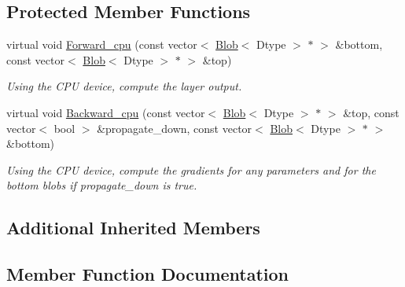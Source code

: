 \subsection*{Protected Member Functions}
\begin{DoxyCompactItemize}
\item 
virtual void \hyperlink{classcaffe_1_1ParameterLayer_a487f3dc2b570a6269b6fd17e8eb5944f}{Forward\+\_\+cpu} (const vector$<$ \hyperlink{classcaffe_1_1Blob}{Blob}$<$ Dtype $>$ $\ast$ $>$ \&bottom, const vector$<$ \hyperlink{classcaffe_1_1Blob}{Blob}$<$ Dtype $>$ $\ast$ $>$ \&top)\hypertarget{classcaffe_1_1ParameterLayer_a487f3dc2b570a6269b6fd17e8eb5944f}{}\label{classcaffe_1_1ParameterLayer_a487f3dc2b570a6269b6fd17e8eb5944f}

\begin{DoxyCompactList}\small\item\em Using the C\+PU device, compute the layer output. \end{DoxyCompactList}\item 
virtual void \hyperlink{classcaffe_1_1ParameterLayer_a68a19926ffed79278295b1717d7d4ad7}{Backward\+\_\+cpu} (const vector$<$ \hyperlink{classcaffe_1_1Blob}{Blob}$<$ Dtype $>$ $\ast$ $>$ \&top, const vector$<$ bool $>$ \&propagate\+\_\+down, const vector$<$ \hyperlink{classcaffe_1_1Blob}{Blob}$<$ Dtype $>$ $\ast$ $>$ \&bottom)\hypertarget{classcaffe_1_1ParameterLayer_a68a19926ffed79278295b1717d7d4ad7}{}\label{classcaffe_1_1ParameterLayer_a68a19926ffed79278295b1717d7d4ad7}

\begin{DoxyCompactList}\small\item\em Using the C\+PU device, compute the gradients for any parameters and for the bottom blobs if propagate\+\_\+down is true. \end{DoxyCompactList}\end{DoxyCompactItemize}
\subsection*{Additional Inherited Members}


\subsection{Member Function Documentation}
